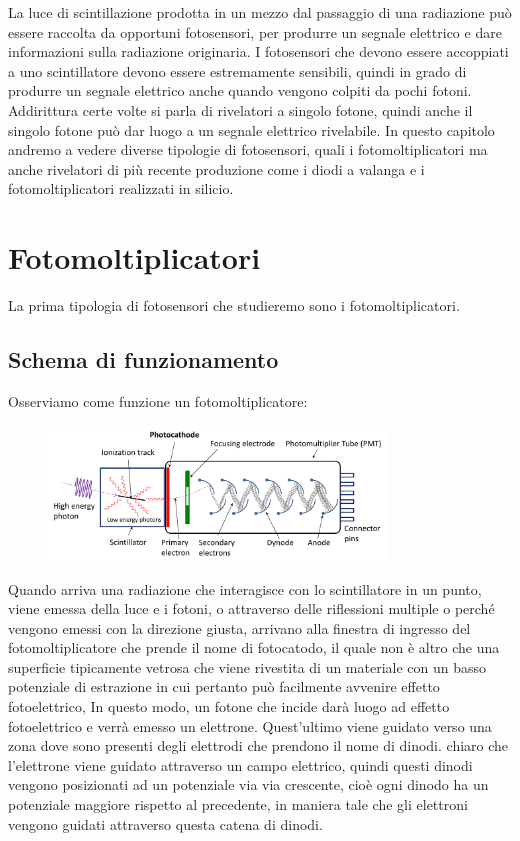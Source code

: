 La luce di scintillazione prodotta in un mezzo dal passaggio di una radiazione può essere raccolta da opportuni fotosensori, per produrre un segnale elettrico e dare informazioni sulla radiazione originaria. I fotosensori che devono essere accoppiati a uno scintillatore devono essere estremamente sensibili, quindi in grado di produrre un segnale elettrico anche quando vengono colpiti da pochi fotoni. Addirittura certe volte si parla di rivelatori a singolo fotone, quindi anche il singolo fotone può dar luogo a un segnale elettrico rivelabile. In questo capitolo andremo a vedere diverse tipologie di fotosensori, quali i fotomoltiplicatori ma anche rivelatori di più recente produzione come i diodi a valanga e i fotomoltiplicatori realizzati in silicio.

\section{Fotomoltiplicatori}

La prima tipologia di fotosensori che studieremo sono i fotomoltiplicatori.

\subsection{Schema di funzionamento}

Osserviamo come funzione un fotomoltiplicatore:

\begin{figure}[H]
   \centering
   \includegraphics[width=0.8\textwidth]{immagini/fotomoltiplicatore.png}
\end{figure}

Quando arriva una radiazione che interagisce con lo scintillatore in un punto, viene emessa della luce e i fotoni, o attraverso delle riflessioni multiple o perché vengono emessi con la direzione giusta, arrivano alla finestra di ingresso del fotomoltiplicatore che prende il nome di fotocatodo, il quale non è altro che una superficie tipicamente vetrosa che viene rivestita di un materiale con un basso potenziale di estrazione in cui pertanto può facilmente avvenire effetto fotoelettrico, In questo modo, un fotone che incide darà luogo ad effetto fotoelettrico e verrà emesso un elettrone. Quest'ultimo viene guidato verso una zona dove sono presenti degli elettrodi che prendono il nome di dinodi. \E chiaro che l'elettrone viene guidato attraverso un campo elettrico, quindi questi dinodi vengono posizionati ad un potenziale via via crescente, cioè ogni dinodo ha un potenziale maggiore rispetto al precedente, in maniera tale che gli elettroni vengono guidati attraverso questa catena di dinodi.

